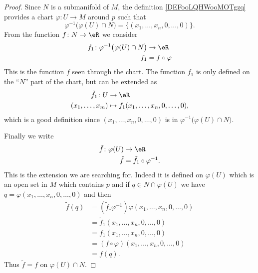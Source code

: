 \begin{proof}
	Since \( N\) is a submanifold of \( M\), the definition \ref{DEFooLQHWooMOTgzq} provides a chart \( \varphi\colon U\to M\) around \( p\) such that
	\begin{equation}
		\varphi^{-1}\big( \varphi(U)\cap N \big)=\{ (x_1,\ldots, x_n,0,\ldots, 0) \}.
	\end{equation}
	From the function \( f\colon N\to \eR\) we consider
	\begin{equation}
		\begin{aligned}
			f_1\colon \varphi^{-1}\big( \varphi(U)\cap N \big) & \to \eR        \\
			f_1                                                & =f\circ\varphi
		\end{aligned}
	\end{equation}
	This is the function \( f\) seen through the chart. The function \( f_1\) is only defined on the ``\( N\)'' part of the chart, but can be extended as
	\begin{equation}
		\begin{aligned}
			\tilde f_1\colon U & \to \eR                                   \\
			(x_1,\ldots, x_m)  & \mapsto f_1(x_1,\ldots, x_n,0,\ldots, 0),
		\end{aligned}
	\end{equation}
	which is a good definition since \( (x_1,\ldots, x_n,0,\ldots, 0)\) is in \( \varphi^{-1}\big( \varphi(U)\cap N \big)\).

	Finally we write
	\begin{equation}
		\begin{aligned}
			\tilde f\colon \varphi(U) & \to \eR                       \\
			\tilde f                  & =\tilde f_1\circ\varphi^{-1}.
		\end{aligned}
	\end{equation}
	This is the extension we are searching for. Indeed it is defined on \( \varphi(U)\) which is an open set in \( M\) which contains \( p\) and if \( q\in N\cap\varphi(U)\) we have \( q=\varphi(x_1,\ldots, x_n,0,\ldots, 0)\) and then
	\begin{subequations}
		\begin{align}
			\tilde f(q) & =(\tilde f_\circ\varphi^{-1})\varphi(x_1,\ldots, x_n,0,\ldots, 0) \\
			            & =\tilde f_1(x_1,\ldots, x_n,0,\ldots, 0)                          \\
			            & =f_1(x_1,\ldots, x_n,0,\ldots, 0)                                 \\
			            & =(f\circ\varphi)(x_1,\ldots, x_n,0,\ldots, 0)                     \\
			            & =f(q).
		\end{align}
	\end{subequations}
	Thus \( \tilde f=f\) on \( \varphi(U)\cap N\).
\end{proof}

